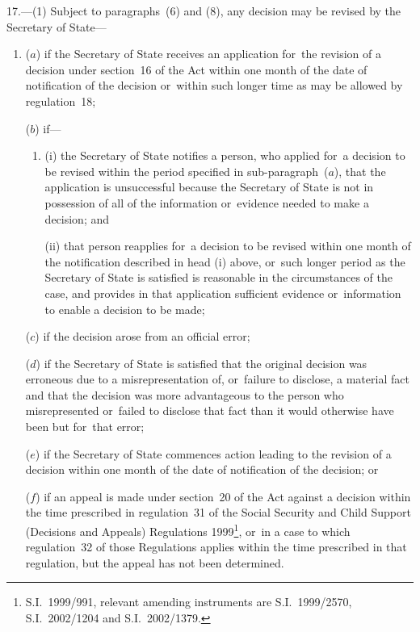 \documentclass[a4paper,12pt]{article}
\begin{document}
17.—(1) Subject to paragraphs~(6) and (8), any decision may be revised by the Secretary of State---
\begin{enumerate}\item[]
($a$) if the Secretary of State receives an application for~the revision of a decision under section~16 of the Act within one month of the date of notification of the decision or~within such longer time as may be allowed by regulation~18;

($b$) if---
\begin{enumerate}\item[]
(i) the Secretary of State notifies a person, who applied for~a decision to be revised within the period specified in sub-paragraph~($a$), that the application is unsuccessful because the Secretary of State is not in possession of all of the information or~evidence needed to make a decision; and

(ii) that person reapplies for~a decision to be revised within one month of the notification described in head (i) above, or~such longer period as the Secretary of State is satisfied is reasonable in the circumstances of the case, and provides in that application sufficient evidence or~information to enable a decision to be made;
\end{enumerate}

($c$) if the decision arose from an official error;

($d$) if the Secretary of State is satisfied that the original decision was erroneous due to a misrepresentation of, or~failure to disclose, a material fact and that the decision was more advantageous to the person who misrepresented or~failed to disclose that fact than it would otherwise have been but for~that error; 

($e$) if the Secretary of State commences action leading to the revision of a decision within one month of the date of notification of the decision;
%
or

    ($f$) 
    if an appeal is made under section~20 of the Act against a decision within the time prescribed in regulation~31 of the Social Security and Child Support (Decisions and Appeals) Regulations 1999\footnote{S.I.~1999/991, relevant amending instruments are S.I.~1999/2570, S.I.~2002/1204 and S.I.~2002/1379.}, or~in a case to which regulation~32 of those Regulations applies within the time prescribed in that regulation, but the appeal has not been determined.
\end{enumerate}
\end{document}
